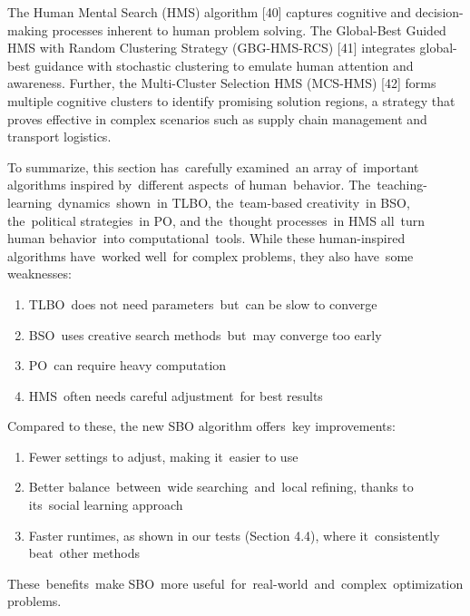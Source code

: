 \documentclass{article} %
\begin{document}
The Human Mental Search (HMS) algorithm [40] captures cognitive and decision-making processes inherent to human problem solving. The Global-Best Guided HMS with Random Clustering Strategy (GBG-HMS-RCS) [41] integrates global-best guidance with stochastic clustering to emulate human attention and awareness. Further, the Multi-Cluster Selection HMS (MCS-HMS) [42] forms multiple cognitive clusters to identify promising solution regions, a strategy that proves effective in complex scenarios such as supply chain management and transport logistics.

To summarize, this section has~carefully examined~an array of~important algorithms inspired by~different aspects~of human~behavior. The~teaching-learning~dynamics~shown~in TLBO, the~team-based creativity~in BSO, the~political strategies~in PO, and the~thought processes~in HMS all~turn human behavior~into computational~tools. While these human-inspired algorithms have~worked well~for complex problems, they also have~some weaknesses:

\begin{enumerate}
\item  TLBO~does not need parameters~but~can be slow to converge

\item  BSO~uses creative search methods~but~may converge too early

\item  PO~can require heavy computation

\item  HMS~often needs careful adjustment~for best results
\end{enumerate}

\noindent Compared to these, the new SBO algorithm offers~key improvements:

\begin{enumerate}
\item  Fewer settings to adjust, making it~easier to use

\item  Better balance~between~wide searching~and~local refining, thanks to its~social learning approach

\item  Faster runtimes, as shown in our tests (Section 4.4), where it~consistently beat~other methods
\end{enumerate}

\noindent These~benefits~make SBO~more useful~for~real-world~and~complex~optimization problems.
\end{document}
